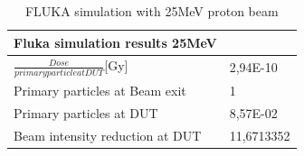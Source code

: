 \documentclass[12pt]{article}
\numberwithin{figure}{section}
\begin{document}
\begin{table}
  \centering
    \begin{tabular}{|l|l|}\hline
    Fluka simulation results 25MeV &  \\\hline\hline
    $\frac{Dose}{primary particle at DUT}$[Gy] & 2,94E-10 \\\hline
    Primary particles at Beam exit & 1 \\\hline
    Primary particles at DUT & 8,57E-02 \\\hline
    Beam intensity reduction  at DUT & 11,6713352 \\\hline
    \end{tabular}%
    \caption{FLUKA simulation with 25MeV proton beam}
  \label{FLUKA_28}%
\end{table}%


\FloatBarrier

\newpage


\end{document}
